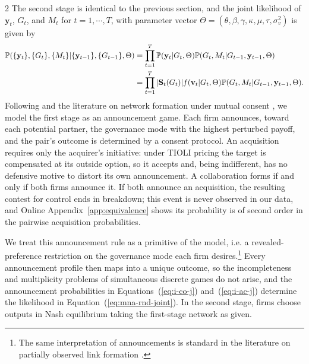\documentclass[12pt]{article}
\begin{document}
\begin{spacing}{2}
The second stage is identical to the previous section, and the joint likelihood of $\mathbf{y}_t$, $G_t$, and $M_t$ for $t=1,\cdots,T$, with parameter vector $\Theta=(\theta,\beta,\gamma,\kappa,\mu,\tau,\sigma^2_v)$ is given by 
\begin{align}
\mathbb{P}(\{\mathbf{y}_t\}, \{G_t\}, \{M_t\}|\{\mathbf{y}_{t-1}\}, \{G_{t-1}\},\Theta)
&=
\prod_{t=1}^T
\mathbb{P}(\mathbf{y}_t | G_{t},\Theta)
\mathbb{P}(G_t, M_t | G_{t-1}, \mathbf{y}_{t-1},\Theta) \notag \\
&= 
\prod_{t=1}^T
|\mathbf{S}_t(G_t)|f(\mathbf{v}_t|G_t,\Theta)
\mathbb{P}(G_t, M_t | G_{t-1}, \mathbf{y}_{t-1},\Theta).  
\label{eq:joint_likelihood_full} 
\end{align}
Following \citet{Myerson1977,Myerson1991} and the literature on network
formation under mutual consent \citep{JacksonWolinsky1996}, we model the first
stage as an announcement game. Each firm announces, toward each potential
partner, the governance mode with the highest perturbed payoff, and the pair's
outcome is determined by a consent protocol. An acquisition requires only the
acquirer's initiative: under TIOLI pricing the target is compensated at its
outside option, so it accepts and, being indifferent, has no defensive motive
to distort its own announcement. A collaboration forms if and only if both
firms announce it. If both announce an acquisition, the resulting contest for
control ends in breakdown; this event is never observed in our data, and Online
Appendix~\ref{app:equivalence} shows its probability is of second order in the
pairwise acquisition probabilities.

We treat this announcement rule as a primitive of the model, i.e. a
revealed-preference restriction on the governance mode each firm
desires.\footnote{The same interpretation of announcements is standard in the
literature on partially observed link formation
\citep{Poirier1980,Comola2012}.} Every announcement profile then maps into a
unique outcome, so the incompleteness and multiplicity problems of simultaneous
discrete games
\citep{tamer2003incomplete,bresnahan1991empirical,depaula2013econometric} do not
arise, and the announcement probabilities in
Equations~(\ref{eq:i-co-j}) and~(\ref{eq:i-ac-j}) determine the likelihood in
Equation~(\ref{eq:mna-rnd-joint}). In the second stage, firms choose outputs in
Nash equilibrium taking the first-stage network as given.


\end{spacing}
\end{document}
